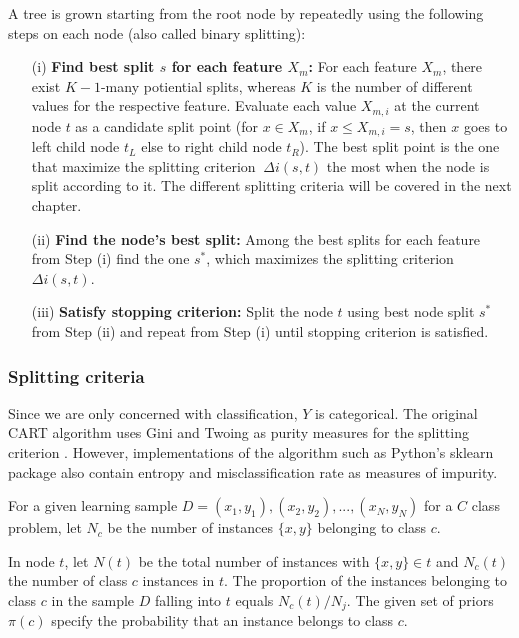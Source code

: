 A tree is grown starting from the root node by repeatedly using the following steps on each
node (also called binary splitting):

\begin{itemize}
    \item[(i)] \textbf{Find best split \(s\) for each feature \(X_{m}\):}
    For each feature \(X_{m}\), there exist \(K-1\)-many potiential splits, whereas \(K\) is the number of different values for the respective feature.
    Evaluate each value \(X_{m,i}\) at the current node \(t\) as a candidate split point (for \(x \in X_{m}\), if \(x \leq X_{m,i}=s\),
    then \(x\) goes to left child node \(t_{L}\) else to right child node \(t_{R}\)).
    The best split point is the one that maximize the splitting criterion \(\ \Delta i(s,t) \) the most when the node is split according to it.
    The different splitting criteria will be covered in the next chapter.
    \item[(ii)] \textbf{Find the node’s best split:} Among the best splits for each feature from Step (i) find the one \(s^{*}\), which maximizes the splitting criterion \(\Delta i(s,t)\).
    \item[(iii)] \textbf{Satisfy stopping criterion:} Split the node \(t\) using best node split \(s^{*}\) from Step (ii) and 
    repeat from Step (i) until stopping criterion is satisfied. 
\end{itemize}

\subsubsection{Splitting criteria}
Since we are only concerned with classification, \(Y\) is categorical. The original CART algorithm uses Gini and Twoing as 
purity measures for the splitting criterion \cite{breiman1984classification}. 
However, implementations of the algorithm such as Python's sklearn package \cite{scikit2011learn} also contain entropy and misclassification rate as measures of impurity.

For a given learning sample \( D = {(x_{1},y_{1}), (x_{2}, y_{2}), ... , (x_{N}, y_{N})} \) 
for a \(C\) class problem, let \(N_{c}\) be the number of instances \( \{x,y\}  \)
belonging to class \(c\).

In node \(t\), let \(N(t)\) be the total number of instances with \( \{x,y\} \in t \) 
and \( N_{c}(t) \) the number of class \(c\) instances in \(t\). 
The proportion of the instances belonging to class \(c\) in the sample \(D\) falling into \(t\) 
equals \( N_{c}(t) / N_{j} \).
The given set of priors \( \pi(c) \) specify the probability that an instance belongs to class \(c\).


